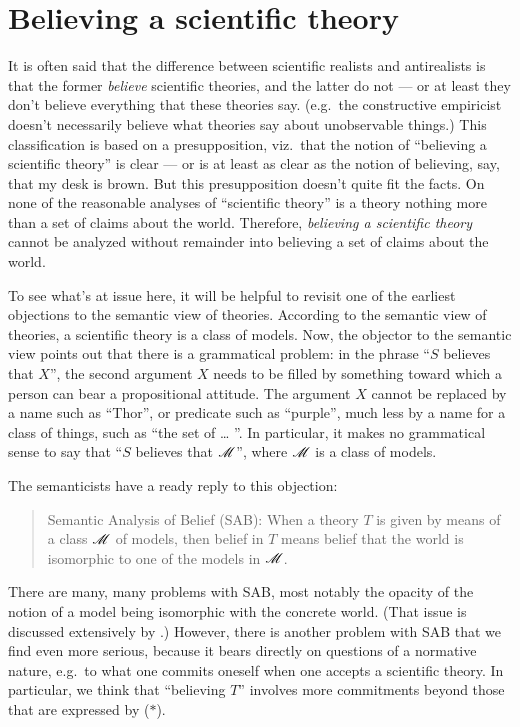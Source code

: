 \section{Believing a scientific theory}

It is often said that the difference between scientific realists and
antirealists is that the former {\it believe} scientific theories, and
the latter do not --- or at least they don't believe everything that
these theories say.  (e.g.\ the constructive empiricist doesn't
necessarily believe what theories say about unobservable things.)
This classification is based on a presupposition, viz.\ that the
notion of ``believing a scientific theory'' is clear --- or is at
least as clear as the notion of believing, say, that my desk is brown.
But this presupposition doesn't quite fit the facts.  On none of the
reasonable analyses of ``scientific theory'' is a theory nothing more
than a set of claims about the world.  Therefore, {\it believing a
  scientific theory} cannot be analyzed without remainder into
believing a set of claims about the world.

To see what's at issue here, it will be helpful to revisit one of the
earliest objections to the semantic view of theories.  According to
the semantic view of theories, a scientific theory is a class of
models.  Now, the objector to the semantic view points out that there
is a grammatical problem: in the phrase ``$S$ believes that $X$'', the
second argument $X$ needs to be filled by something toward which a
person can bear a propositional attitude.  The argument $X$ cannot be
replaced by a name such as ``Thor'', or predicate such as ``purple'',
much less by a name for a class of things, such as ``the set of \dots
''.  In particular, it makes no grammatical sense to say that ``$S$
believes that $\mathscr M$'', where $\mathscr M$ is a class of models.

The semanticists have a ready reply to this objection:
\begin{quote}
  Semantic Analysis of Belief (SAB): When a theory $T$ is given by
  means of a class $\mathscr M$ of models, then belief in $T$ means belief
  that the world is isomorphic to one of the models in
  $\mathscr M$. \end{quote} There are many, many problems with SAB, most
notably the opacity of the notion of a model being isomorphic with the
concrete world.  (That issue is discussed extensively by
\cite{bas2008}.)  However, there is another problem with SAB that we
find even more serious, because it bears directly on questions of a
normative nature, e.g.\ to what one commits oneself when one accepts a
scientific theory.  In particular, we think that ``believing $T$''
involves more commitments beyond those that are expressed by ($\ast$).


